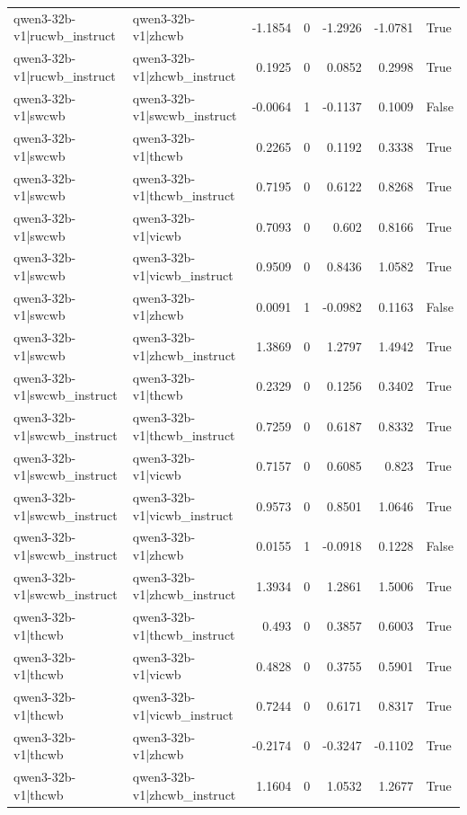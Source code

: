 \begin{table}
\begin{tabular}{l l r r r r l}
qwen3-32b-v1|rucwb_instruct & qwen3-32b-v1|zhcwb & -1.1854 & 0 & -1.2926 & -1.0781 & True \\
qwen3-32b-v1|rucwb_instruct & qwen3-32b-v1|zhcwb_instruct & 0.1925 & 0 & 0.0852 & 0.2998 & True \\
qwen3-32b-v1|swcwb & qwen3-32b-v1|swcwb_instruct & -0.0064 & 1 & -0.1137 & 0.1009 & False \\
qwen3-32b-v1|swcwb & qwen3-32b-v1|thcwb & 0.2265 & 0 & 0.1192 & 0.3338 & True \\
qwen3-32b-v1|swcwb & qwen3-32b-v1|thcwb_instruct & 0.7195 & 0 & 0.6122 & 0.8268 & True \\
qwen3-32b-v1|swcwb & qwen3-32b-v1|vicwb & 0.7093 & 0 & 0.602 & 0.8166 & True \\
qwen3-32b-v1|swcwb & qwen3-32b-v1|vicwb_instruct & 0.9509 & 0 & 0.8436 & 1.0582 & True \\
qwen3-32b-v1|swcwb & qwen3-32b-v1|zhcwb & 0.0091 & 1 & -0.0982 & 0.1163 & False \\
qwen3-32b-v1|swcwb & qwen3-32b-v1|zhcwb_instruct & 1.3869 & 0 & 1.2797 & 1.4942 & True \\
qwen3-32b-v1|swcwb_instruct & qwen3-32b-v1|thcwb & 0.2329 & 0 & 0.1256 & 0.3402 & True \\
qwen3-32b-v1|swcwb_instruct & qwen3-32b-v1|thcwb_instruct & 0.7259 & 0 & 0.6187 & 0.8332 & True \\
qwen3-32b-v1|swcwb_instruct & qwen3-32b-v1|vicwb & 0.7157 & 0 & 0.6085 & 0.823 & True \\
qwen3-32b-v1|swcwb_instruct & qwen3-32b-v1|vicwb_instruct & 0.9573 & 0 & 0.8501 & 1.0646 & True \\
qwen3-32b-v1|swcwb_instruct & qwen3-32b-v1|zhcwb & 0.0155 & 1 & -0.0918 & 0.1228 & False \\
qwen3-32b-v1|swcwb_instruct & qwen3-32b-v1|zhcwb_instruct & 1.3934 & 0 & 1.2861 & 1.5006 & True \\
qwen3-32b-v1|thcwb & qwen3-32b-v1|thcwb_instruct & 0.493 & 0 & 0.3857 & 0.6003 & True \\
qwen3-32b-v1|thcwb & qwen3-32b-v1|vicwb & 0.4828 & 0 & 0.3755 & 0.5901 & True \\
qwen3-32b-v1|thcwb & qwen3-32b-v1|vicwb_instruct & 0.7244 & 0 & 0.6171 & 0.8317 & True \\
qwen3-32b-v1|thcwb & qwen3-32b-v1|zhcwb & -0.2174 & 0 & -0.3247 & -0.1102 & True \\
qwen3-32b-v1|thcwb & qwen3-32b-v1|zhcwb_instruct & 1.1604 & 0 & 1.0532 & 1.2677 & True \\

\end{tabular}
\end{table}
